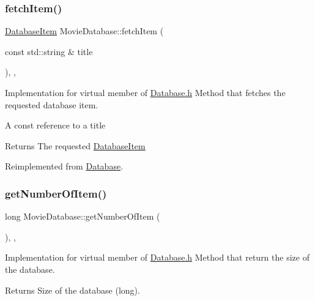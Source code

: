 \subsubsection{\texorpdfstring{fetch\+Item()}{fetchItem()}}
{\footnotesize\ttfamily \hyperlink{classDatabaseItem}{Database\+Item} Movie\+Database\+::fetch\+Item (\begin{DoxyParamCaption}\item[{const std\+::string \&}]{title }\end{DoxyParamCaption})\hspace{0.3cm}{\ttfamily [inline]}, {\ttfamily [override]}, {\ttfamily [virtual]}}



Implementation for virtual member of \hyperlink{Database_8h_source}{Database.\+h} Method that fetches the requested database item. 

A const reference to a title

\begin{DoxyReturn}{Returns}
The requested \hyperlink{classDatabaseItem}{Database\+Item}
\end{DoxyReturn}


Reimplemented from \hyperlink{classDatabase_a40254eec69c7d7cc15da24a9f0b072b3}{Database}.

\mbox{\label{classMovieDatabase_a9a386f51dd72d63414a124cbcfcd879b}} 
\subsubsection{\texorpdfstring{get\+Number\+Of\+Item()}{getNumberOfItem()}}
{\footnotesize\ttfamily long Movie\+Database\+::get\+Number\+Of\+Item (\begin{DoxyParamCaption}{ }\end{DoxyParamCaption})\hspace{0.3cm}{\ttfamily [inline]}, {\ttfamily [override]}, {\ttfamily [virtual]}}



Implementation for virtual member of \hyperlink{Database_8h_source}{Database.\+h} Method that return the size of the database. 

\begin{DoxyReturn}{Returns}
Size of the database (long).
\end{DoxyReturn}


